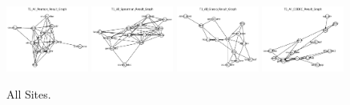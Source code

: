 \begin{figure}
    \includegraphics[width=0.24\textwidth]{chap6/figs/T1_All_Pearson_Result_Graph.png}
    \includegraphics[width=0.24\textwidth]{chap6/figs/T1_All_Spearman_Result_Graph.png}
    \includegraphics[width=0.24\textwidth]{chap6/figs/T1_All_Glasso_Result_Graph.png}
    \includegraphics[width=0.24\textwidth]{chap6/figs/T1_All_CODEC_Result_Graph.png}
    \caption{All Sites.}
    \label{fig:all}
\end{figure}

